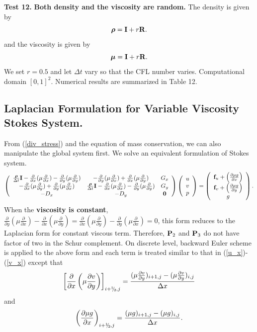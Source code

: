 \documentclass[9pt]{article}
\newcommand{\V}[1]{\boldsymbol{#1}}
\newcommand{\sfrac}[2]{\mathchoice
  {\kern0em\raise.5ex\hbox{\the\scriptfont0 #1}\kern-.15em/
   \kern-.15em\lower.25ex\hbox{\the\scriptfont0 #2}}
  {\kern0em\raise.5ex\hbox{\the\scriptfont0 #1}\kern-.15em/
   \kern-.15em\lower.25ex\hbox{\the\scriptfont0 #2}}
  {\kern0em\raise.5ex\hbox{\the\scriptscriptfont0 #1}\kern-.2em/
   \kern-.15em\lower.25ex\hbox{\the\scriptscriptfont0 #2}}
  {#1\!/#2}}
\def\myhalf {\sfrac{1}{2}}
\begin{document}
{\bf Test 12.} {\bf Both density and the viscosity are random.} The density is given by
$$
\V{\rho} = {\bf I}+ r {\bf R}.
$$
and the viscosity is given by
$$
{\V{\mu}} = {\bf I}+ r {\bf R}.
$$
We set $r=0.5$ and let $\Delta t$ vary so that the CFL number varies. Computational domain $[0, 1]^2$. Numerical results are summarized in Table 12.

\subsection{Laplacian Formulation for Variable Viscosity Stokes System.}
From (\ref{div_stress}) and the equation of mass conservation, we can also manipulate the global system first.
We solve an equivalent formulation of Stokes system.
\begin{equation}\label{AD_stress_form}
\left(\begin{array}{ccc}
\frac{{\V{\rho}}}{\Delta t}{\bf I}-\frac{\partial}{\partial x}(\mu \frac{\partial}{\partial x})-\frac{\partial}{\partial y}(\mu \frac{\partial}{\partial y})     &  -\frac{\partial}{\partial y}(\mu \frac{\partial}{\partial x})+\frac{\partial}{\partial x}(\mu \frac{\partial}{\partial y})  & G_x\\
-\frac{\partial}{\partial x}(\mu \frac{\partial}{\partial y})+\frac{\partial}{\partial y}(\mu \frac{\partial}{\partial x})      &  \frac{{\V{\rho}}}{\Delta t}{\bf I}-\frac{\partial}{\partial x}(\mu \frac{\partial}{\partial x})-\frac{\partial}{\partial y}(\mu \frac{\partial}{\partial y})  & G_y\\
-D_x     &         -D_y         &     {\bf 0}
\end{array}\right)
\left(\begin{array}{c}
{    u}  \\
{    v} \\
{    p}
\end{array}\right)=
\left(\begin{array}{c}
{\bf f}_u+\left(\frac{\partial \mu g}{\partial x} \right)  \\
{\bf f}_v+\left(\frac{\partial \mu g}{\partial y} \right)  \\
{    g}
\end{array}\right).
\end{equation}
When the {\bf viscosity is constant}, $\frac{\partial}{\partial y}(\mu \frac{\partial}{\partial x})-\frac{\partial}{\partial x}(\mu \frac{\partial}{\partial y})=\frac{\partial}{\partial x}(\mu \frac{\partial}{\partial y})-\frac{\partial}{\partial y}(\mu \frac{\partial}{\partial x}) = 0$, this form reduces to the Laplacian form for constant viscous term. Therefore, ${\bf P}_2$ and ${\bf P}_3$ do not have factor of two in the Schur complement. On discrete level, backward Euler scheme is applied to the above form and each term is treated similar to that in (\ref{u_x})-(\ref{v_x}) except that
$$
\left[\frac{\partial}{\partial x}\left(\mu \frac{\partial v}{\partial y}\right)\right]_{i+\myhalf,j}=\frac{(\mu \frac{\partial v}{\partial y})_{i+1,j} - (\mu \frac{\partial v}{\partial y})_{i, j}}{\Delta x}
$$
and
$$
\left(\frac{\partial \mu g}{\partial x} \right)_{i+\myhalf, j}=\frac{(\mu g)_{i+1, j}-(\mu g)_{i,j}}{\Delta x}.
$$
\end{document}
